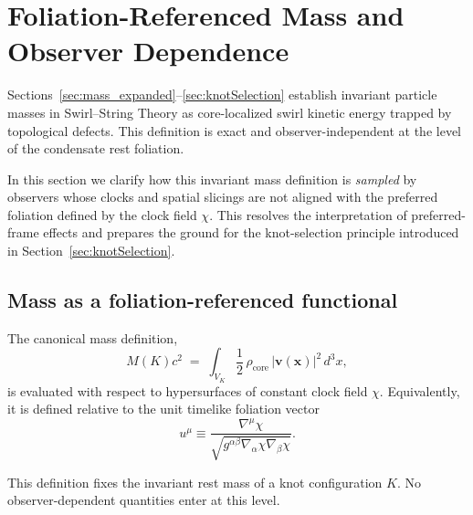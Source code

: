 \documentclass[10pt]{article}
\begin{document}
    \section{Foliation-Referenced Mass and Observer Dependence}
    \label{sec:foliation_mass}

    Sections~\ref{sec:mass_expanded}--\ref{sec:knotSelection} establish invariant particle masses in Swirl--String Theory
    as core-localized swirl kinetic energy trapped by topological defects.
    This definition is exact and observer-independent at the level of the
    condensate rest foliation.

    In this section we clarify how this invariant mass definition is
    \emph{sampled} by observers whose clocks and spatial slicings are
    not aligned with the preferred foliation defined by the clock field $\chi$.
    This resolves the interpretation of preferred-frame effects and
    prepares the ground for the knot-selection principle introduced in
    Section~\ref{sec:knotSelection}.

    \subsection{Mass as a foliation-referenced functional}

        The canonical mass definition,
        \begin{equation}
            M(K)c^2
            \;=\;
            \int_{V_K} \frac{1}{2}\,\rho_{\text{core}}\,|\mathbf{v}(\mathbf{x})|^2 \, d^3x ,
        \end{equation}
        is evaluated with respect to hypersurfaces of constant clock field $\chi$.
        Equivalently, it is defined relative to the unit timelike foliation vector
        \begin{equation}
            u^\mu \equiv
            \frac{\nabla^\mu \chi}{\sqrt{g^{\alpha\beta}\nabla_\alpha \chi \nabla_\beta \chi}} .
        \end{equation}

        This definition fixes the invariant rest mass of a knot configuration $K$.
        No observer-dependent quantities enter at this level.
\end{document}
